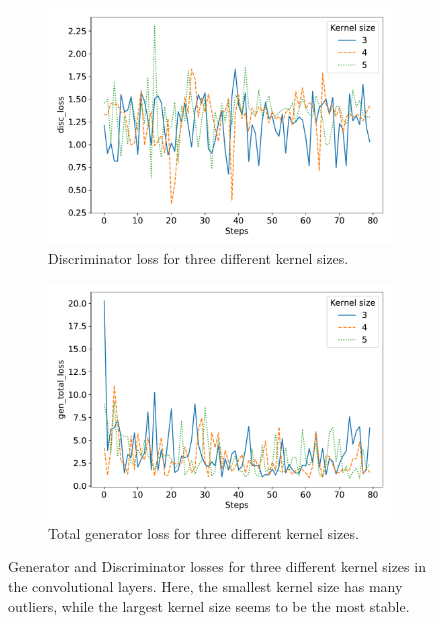 \begin{figure}
	\centering
	\begin{subfigure}{\linewidth}
		\centering
		\includegraphics[width=\textwidth]{fig/analysis/Plot_Kernel_size_disc_loss.pdf}
		\caption{Discriminator loss for three different kernel sizes. }
		\label{fig:Plot_kernel_size_discloss}
	\end{subfigure}\hfill
	\begin{subfigure}{\linewidth}
		\centering
		\includegraphics[width=\textwidth]{fig/analysis/Plot_Kernel_size_gen_total_loss.pdf}
		\caption{Total generator loss for three different kernel sizes.}
		\label{fig:Plot_kernel_size_genloss}
	\end{subfigure}\hfill
	\caption{Generator and Discriminator losses for three different kernel sizes in the convolutional layers. Here, the smallest kernel size has many outliers, while the largest kernel size seems to be the most stable.}
	\label{fig:Plot_kernel_size_loss}
\end{figure}
